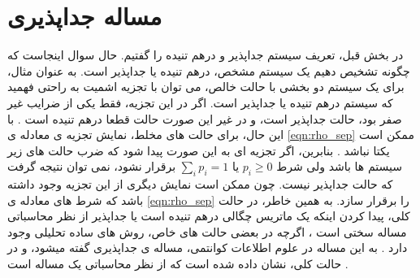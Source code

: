 \section{مساله جداپذیری}

در بخش قبل، تعریف سیستم جداپذیر و درهم تنیده را گفتیم. حال سوال اینجاست که چگونه تشخیص دهیم یک سیستم مشخص، درهم تنیده یا جداپذیر است.
به عنوان مثال، برای یک سیستم دو بخشی با حالت خالص،‌ می توان با تجزیه اشمیت
به راحتی فهمید که سیستم درهم تنیده یا جداپذیر است.
اگر در این تجزیه، فقط یکی از ضرایب غیر صفر بود، حالت جداپذیر است، و در غیر این صورت حالت قطعا درهم تنیده است
\cite{Ekert1995,Sciara2017}.
با این حال، برای حالت های مخلط، نمایش تجزیه ی معادله ی
\ref{eqn:rho_sep}
ممکن است یکتا نباشد
\cite{Ekert1995,Sciara2017}.
بنابرین، اگر تجزیه ای به این صورت پیدا شود که ضرب حالت های زیر سیستم ها باشد ولی شرط
$p_i \geq 0$
یا
$\sum_i p_i =1$
برقرار نشود، نمی توان نتیجه گرفت که حالت جداپذیر نیست. چون ممکن است نمایش دیگری از این تجزیه وجود داشته باشد که شرط های معادله ی
\ref{eqn:rho_sep}
را برقرار سازد.
به همین خاطر، در حالت کلی، پیدا کردن اینکه یک ماتریس چگالی درهم تنیده است یا جداپذیر از نظر محاسباتی مساله سختی است
\cite{Vedral1997}،
اگرچه در بعضی حالت های خاص،‌ روش های ساده تحلیلی وجود دارد
\cite{horodecki_1996}.
به این مساله در علوم اطلاعات کوانتمی، مساله ی جداپذیری
گفته میشود،
و در حالت کلی، نشان داده شده است که از نظر محاسباتی یک مساله
است
\cite{gharibia_2010}.
